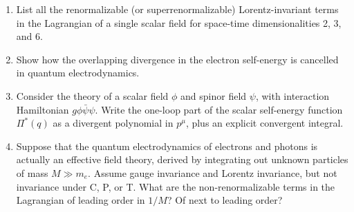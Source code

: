 

\begin{enumerate}
\item List all the renormalizable (or superrenormalizable) Lorentz-invariant
terms in the Lagrangian of a single scalar field for space-time
dimensionalities 2, 3, and 6.

\item Show how the overlapping divergence in the electron self-energy is
cancelled in quantum electrodynamics.

\item Consider the theory of a scalar field $\phi$ and spinor field $\psi$,
with interaction Hamiltonian $g\phi\bar\psi\psi$. Write the one-loop part of
the scalar self-energy function $\Pi^*(q)$ as a divergent polynomial in
$p^\mu$, plus an explicit convergent integral.

\item Suppose that the quantum electrodynamics of electrons and photons is
actually an effective field theory, derived by integrating out unknown
particles of mass $M\gg m_e$. Assume gauge invariance and Lorentz invariance,
but not invariance under C, P, or T. What are the non-renormalizable terms in
the Lagrangian of leading order in $1/M$? Of next to leading order?
\end{enumerate}


